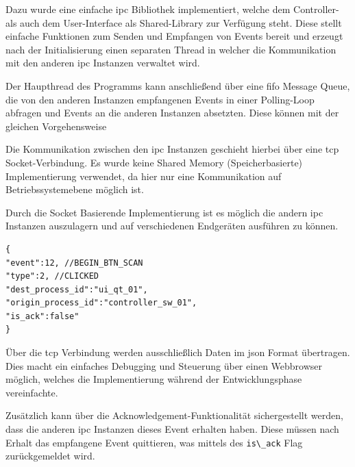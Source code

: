 Dazu wurde eine einfache \gls{ipc} Bibliothek implementiert, welche dem
Controller- als auch dem User-Interface als Shared-Library zur Verfügung
steht. Diese stellt einfache Funktionen zum Senden und Empfangen von
Events bereit und erzeugt nach der Initialisierung einen separaten
Thread in welcher die Kommunikation mit den anderen \gls{ipc} Instanzen
verwaltet wird.

Der Haupthread des Programms kann anschließend über eine \gls{fifo}
Message Queue, die von den anderen Instanzen empfangenen Events in einer
Polling-Loop abfragen und Events an die anderen Instanzen absetzten.
Diese können mit der gleichen Vorgehensweise

Die Kommunikation zwischen den \gls{ipc} Instanzen geschieht hierbei
über eine \gls{tcp} Socket-Verbindung. Es wurde keine Shared Memory
(Speicherbasierte) Implementierung verwendet, da hier nur eine
Kommunikation auf Betriebssystemebene möglich ist.

Durch die Socket Basierende Implementierung ist es möglich die andern
\gls{ipc} Instanzen auszulagern und auf verschiedenen Endgeräten
ausführen zu können.

\begin{lstlisting}
{
"event":12, //BEGIN_BTN_SCAN
"type":2, //CLICKED
"dest_process_id":"ui_qt_01",
"origin_process_id":"controller_sw_01",
"is_ack":false"
}
\end{lstlisting}

Über die \gls{tcp} Verbindung werden ausschließlich Daten im \gls{json}
Format übertragen. Dies macht ein einfaches Debugging und Steuerung über
einen Webbrowser möglich, welches die Implementierung während der
Entwicklungsphase vereinfachte.

Zusätzlich kann über die Acknowledgement-Funktionalität sichergestellt
werden, dass die anderen \gls{ipc} Instanzen dieses Event erhalten
haben. Diese müssen nach Erhalt das empfangene Event quittieren, was
mittels des \passthrough{\lstinline!is\_ack!} Flag zurückgemeldet wird.

